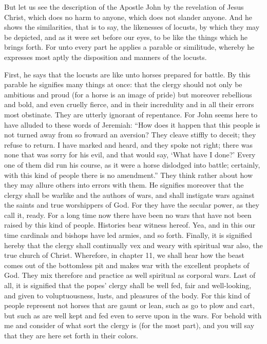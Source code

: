 But let us see the description of the Apostle John by the revelation of Jesus Christ, which does no harm to anyone, which does not slander anyone. And he shows the similarities, that is to say, the likenesses of locusts, by which they may be depicted, and as it were set before our eyes, to be like the things which he brings forth. For unto every part he applies a parable or similitude, whereby he expresses most aptly the disposition and manners of the locusts.

First, he says that the locusts are like unto horses prepared for battle. By this parable he signifies many things at once: that the clergy should not only be ambitious and proud (for a horse is an image of pride) but moreover rebellious and bold, and even cruelly fierce, and in their incredulity and in all their errors most obstinate. They are utterly ignorant of repentance. For John seems here to have alluded to these words of Jeremiah: “How does it happen that this people is not turned away from so froward an aversion? They cleave stiffly to deceit; they refuse to return. I have marked and heard, and they spoke not right; there was none that was sorry for his evil, and that would say, ‘What have I done?’ Every one of them did run his course, as it were a horse dislodged into battle; certainly, with this kind of people there is no amendment.” They think rather about how they may allure others into errors with them. He signifies moreover that the clergy shall be warlike and the authors of wars, and shall instigate wars against the saints and true worshippers of God. For they have the secular power, as they call it, ready. For a long time now there have been no wars that have not been raised by this kind of people. Histories bear witness hereof. Yea, and in this our time cardinals and bishops have led armies, and so forth. Finally, it is signified hereby that the clergy shall continually vex and weary with spiritual war also, the true church of Christ. Wherefore, in chapter 11, we shall hear how the beast comes out of the bottomless pit and makes war with the excellent prophets of God. They mix therefore and practice as well spiritual as corporal wars. Last of all, it is signified that the popes’ clergy shall be well fed, fair and well-looking, and given to voluptuousness, lusts, and pleasures of the body. For this kind of people represent not horses that are gaunt or lean, such as go to plow and cart, but such as are well kept and fed even to serve upon in the wars. For behold with me and consider of what sort the clergy is (for the most part), and you will say that they are here set forth in their colors.

